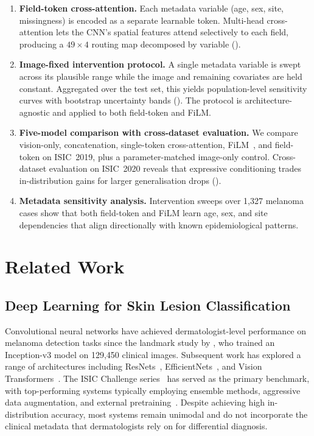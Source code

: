 \documentclass[12pt, a4paper]{article}
\begin{document}
\begin{enumerate}
    \item \textbf{Field-token cross-attention.} Each metadata variable (age, sex, site, missingness) is encoded as a separate learnable token. Multi-head cross-attention lets the CNN's spatial features attend selectively to each field, producing a $49{\times}4$ routing map decomposed by variable ().
    
    \item \textbf{Image-fixed intervention protocol.} A single metadata variable is swept across its plausible range while the image and remaining covariates are held constant. Aggregated over the test set, this yields population-level sensitivity curves with bootstrap uncertainty bands (). The protocol is architecture-agnostic and applied to both field-token and FiLM.
    
    \item \textbf{Five-model comparison with cross-dataset evaluation.} We compare vision-only, concatenation, single-token cross-attention, FiLM~\citep{perez2018film}, and field-token on ISIC~2019, plus a parameter-matched image-only control. Cross-dataset evaluation on ISIC~2020 reveals that expressive conditioning trades in-distribution gains for larger generalisation drops ().
    
    \item \textbf{Metadata sensitivity analysis.} Intervention sweeps over 1{,}327 melanoma cases show that both field-token and FiLM learn age, sex, and site dependencies that align directionally with known epidemiological patterns.
\end{enumerate}

\section{Related Work}
\label{sec:related}

\subsection{Deep Learning for Skin Lesion Classification}

Convolutional neural networks have achieved dermatologist-level performance on melanoma detection tasks since the landmark study by \citet{esteva2017dermatologist}, who trained an Inception-v3 model on 129{,}450 clinical images. Subsequent work has explored a range of architectures including ResNets~\citep{he2016deep}, EfficientNets~\citep{tan2019efficientnet}, and Vision Transformers~\citep{dosovitskiy2021image}. The ISIC Challenge series~\citep{codella2018skin, tschandl2018ham10000, combalia2019bcn20000} has served as the primary benchmark, with top-performing systems typically employing ensemble methods, aggressive data augmentation, and external pretraining~\citep{gessert2020skin}. Despite achieving high in-distribution accuracy, most systems remain unimodal and do not incorporate the clinical metadata that dermatologists rely on for differential diagnosis.
\end{document}

